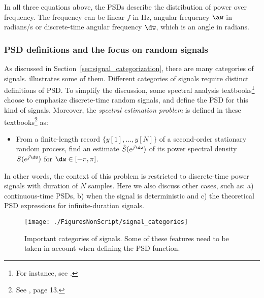 In all three equations above, the PSDs describe the distribution of power over frequency. The frequency can be linear $f$ in Hz, angular frequency $\aw$ 
in radians/s or discrete-time angular frequency $\dw$, which is an angle in radians.



\subsubsection{PSD definitions and the focus on random signals}
As discussed in Section~\ref{sec:signal_categorization}, there are many categories of signals.
 illustrates some of them.
Different categories of signals require distinct definitions of PSD.
To simplify the discussion, some spectral analysis textbooks\footnote{For instance, see \cite{Hayes2009,Stoica05}.} choose to emphasize discrete-time random signals, 
and define the PSD for this kind of signals.
Moreover, the \emph{spectral estimation problem} is defined in these textbooks\footnote{See \cite{Stoica05}, page 13.} as:
\begin{itemize}
\item From a finite-length record $\{y[1], \ldots, y[N] \}$ of a second-order stationary random
process, find an estimate $\hat S(e^{j \dw})$ of its power spectral density $S(e^{j \dw})$ for $\dw \in [-\pi, \pi]$.
\end{itemize}
In other words, the context of this problem is restricted to discrete-time power signals with duration of $N$ samples.
Here we also discuss other cases, such as: a) continuous-time PSDs, b) when the signal is deterministic
and c) the theoretical PSD expressions for infinite-duration signals.

\begin{figure}[htbp]
\centering
\texttt{[image: ./FiguresNonScript/signal\_categories]}
\caption{Important categories of signals. Some of these features need to be taken in account when
defining the PSD function.\label{fig:signal_categories}}
\end{figure}



